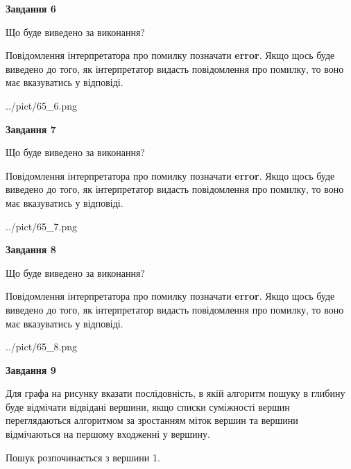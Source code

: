 \documentclass[12pt, ukrainian]{article}
\begin{document}
{\begin {large}
{\begin {center}\textbf{Завдання 6}\end {center}}\par
Що буде виведено за виконання?

Повідомлення інтерпретатора про помилку позначати \textbf{error}.
Якщо щось буде виведено до того, як інтерпретатор видасть повідомлення про помилку, 
то воно має вказуватись у відповіді. \par


\begin{center}
	{../pict/65_6.png}
\end{center}
\newpage

{\begin {center}\textbf{Завдання 7}\end {center}}\par
Що буде виведено за виконання?

Повідомлення інтерпретатора про помилку позначати \textbf{error}.
Якщо щось буде виведено до того, як інтерпретатор видасть повідомлення про помилку, 
то воно має вказуватись у відповіді. \par


\begin{center}
	{../pict/65_7.png}
\end{center}
\newpage

{\begin {center}\textbf{Завдання 8}\end {center}}\par
Що буде виведено за виконання?

Повідомлення інтерпретатора про помилку позначати \textbf{error}.
Якщо щось буде виведено до того, як інтерпретатор видасть повідомлення про помилку, 
то воно має вказуватись у відповіді. \par


\begin{center}
	{../pict/65_8.png}
\end{center}
\newpage

{\begin {center}\textbf{Завдання 9}\end {center}}\par
Для графа на рисунку вказати послідовність, в якій алгоритм пошуку в глибину буде відмічати відвідані вершини, якщо списки суміжності вершин переглядаються алгоритмом за зростанням міток вершин та вершини відмічаються на першому вход\-женні у вершину.\par
Пошук розпочинається з вершини 1.\par


\end{large}}
\end{document}
